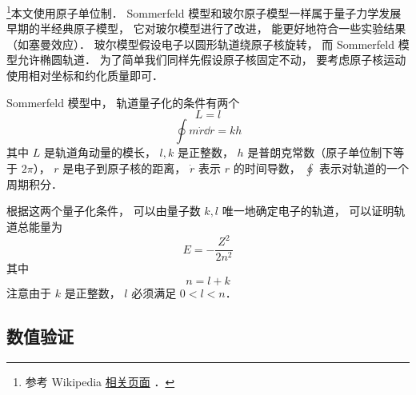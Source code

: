 

\footnote{参考 Wikipedia \href{https://en.wikipedia.org/wiki/Old_quantum_theory}{相关页面}
．}本文使用原子单位制． Sommerfeld 模型和玻尔原子模型一样属于量子力学发展早期的半经典原子模型， 它对玻尔模型进行了改进， 能更好地符合一些实验结果（如塞曼效应）． 玻尔模型假设电子以圆形轨道绕原子核旋转， 而 Sommerfeld 模型允许椭圆轨道． 为了简单我们同样先假设原子核固定不动， 要考虑原子核运动使用相对坐标和约化质量即可．

Sommerfeld 模型中， 轨道量子化的条件有两个
\begin{equation}\label{BohrEc_eq4}
L = l
\end{equation}
\begin{equation}\label{BohrEc_eq3}
\oint m\dot r \dd{r} = kh
\end{equation}
其中 $L$ 是轨道角动量的模长， $l, k$ 是正整数， $h$ 是普朗克常数（原子单位制下等于 $2\pi$）， $r$ 是电子到原子核的距离， $\dot r$ 表示 $r$ 的时间导数， $\oint$ 表示对轨道的一个周期积分．

根据这两个量子化条件， 可以由量子数 $k, l$ 唯一地确定电子的轨道， 可以证明轨道总能量为
\begin{equation}\label{BohrEc_eq5}
E = -\frac{Z^2}{2n^2}
\end{equation}
其中
\begin{equation}\label{BohrEc_eq2}
n = l + k
\end{equation}
注意由于 $k$ 是正整数， $l$ 必须满足 $0 < l < n$．

\subsection{数值验证}

